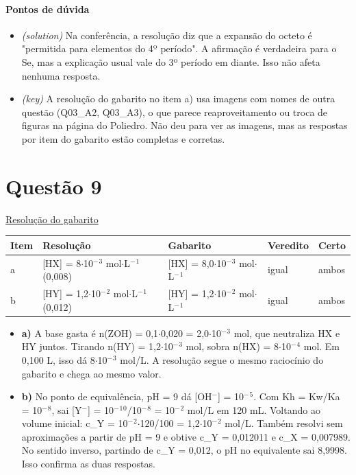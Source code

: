 \documentclass{article}%
\begin{document}
\paragraph{Pontos de dúvida}%
\begin{itemize}%
\item%
\textit{(solution)} Na conferência, a resolução diz que a expansão do octeto é "permitida para elementos do 4º período". A afirmação é verdadeira para o Se, mas a explicação usual vale do 3º período em diante. Isso não afeta nenhuma resposta.%
\item%
\textit{(key)} A resolução do gabarito no item a) usa imagens com nomes de outra questão (Q03\_A2, Q03\_A3), o que parece reaproveitamento ou troca de figuras na página do Poliedro. Não deu para ver as imagens, mas as respostas por item do gabarito estão completas e corretas.%
\end{itemize}%
\section*{Questão 9}%
\href{https://poliedroresolve.sistemapoliedro.com.br/vestibulares/ita/2027/ita-2-fase-dia-2-21-10-2026-2-fase-dia-2/dissertativa-9-quimica-2-fase-dia-2-ita-2027}{Resolução do gabarito}\par\smallskip%
\begin{longtable}{@{}p{} p{} p{} p{} p{}@{}}\toprule Item & Resolução & Gabarito & Veredito & Certo \\ \midrule
a & {[}HX{]} = 8$\cdot$10$^{-}$$^3$ mol$\cdot$L$^{-}$$^{1}$ (0,008) & {[}HX{]} = 8,0$\cdot$10$^{-}$$^3$ mol$\cdot$L$^{-}$$^{1}$ & igual & ambos \\
b & {[}HY{]} = 1,2$\cdot$10$^{-}$$^2$ mol$\cdot$L$^{-}$$^{1}$ (0,012) & {[}HY{]} = 1,2$\cdot$10$^{-}$$^2$ mol$\cdot$L$^{-}$$^{1}$ & igual & ambos \\
\bottomrule\end{longtable}%
\begin{itemize}%
\item%
\textbf{a)} A base gasta é n(ZOH) = 0,1$\cdot$0,020 = 2,0$\cdot$10$^{-}$$^3$ mol, que neutraliza HX e HY juntos. Tirando n(HY) = 1,2$\cdot$10$^{-}$$^3$ mol, sobra n(HX) = 8$\cdot$10$^{-}$$^{4}$ mol. Em 0,100 L, isso dá 8$\cdot$10$^{-}$$^3$ mol/L. A resolução segue o mesmo raciocínio do gabarito e chega ao mesmo valor.%
\item%
\textbf{b)} No ponto de equivalência, pH = 9 dá {[}OH$^{-}${]} = 10$^{-}$$^{5}$. Com Kh = Kw/Ka = 10$^{-}$$^{8}$, sai {[}Y$^{-}${]} = 10$^{-}$$^{1}$$^{0}$/10$^{-}$$^{8}$ = 10$^{-}$$^2$ mol/L em 120 mL. Voltando ao volume inicial: c\_Y = 10$^{-}$$^2$$\cdot$120/100 = 1,2$\cdot$10$^{-}$$^2$ mol/L. Também resolvi sem aproximações a partir de pH = 9 e obtive c\_Y = 0,012011 e c\_X = 0,007989. No sentido inverso, partindo de c\_Y = 0,012, o pH no equivalente sai 8,9998. Isso confirma as duas respostas.%
\end{itemize}%
\end{document}
